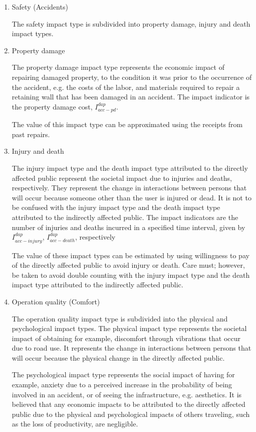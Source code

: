 \begin{enumerate}
 \item Safety (Accidents)

The safety impact type is subdivided into property damage, injury and death impact types. 

\item Property damage

The property damage impact type represents the economic impact of repairing damaged property, to the condition it was prior to the occurrence of the accident, e.g. the costs of the labor, and materials required to repair a retaining wall that has been damaged in an accident. The impact indicator is the property damage cost, $I_{acc - pd}^{dap}$.  

The value of this impact type can be approximated using the receipts from past repairs.


\item Injury and death

The injury impact type and the death impact type attributed to the directly affected public represent the societal impact due to injuries and deaths, respectively. They represent the change in interactions between persons that will occur because someone other than the user is injured or dead. It is not to be confused with the injury impact type and the death impact type attributed to the indirectly affected public. The impact indicators are the number of injuries and deaths incurred in a specified time interval, given by$I_{acc - injury}^{dap}$, $I_{acc - death}^{dap}$, respectively

The value of these impact types can be estimated by using willingness to pay of the directly affected public to avoid injury or death. Care must; however, be taken to avoid double counting with the injury impact type and the death impact type attributed to the indirectly affected public. 

\item Operation quality (Comfort)

The operation quality impact type is subdivided into the physical and psychological impact types. The physical impact type represents the societal impact of obtaining for example, discomfort through vibrations that occur due to road use. It represents the change in interactions between persons that will occur because the physical change in the directly affected public. 

The psychological impact type represents the social impact of having for example, anxiety due to a perceived increase in the probability of being involved in an accident, or of seeing the infrastructure, e.g. aesthetics. It is believed that any economic impacts to be attributed to the directly affected public due to the physical and psychological impacts of others traveling, such as the loss of productivity, are negligible. 


\end{enumerate}
